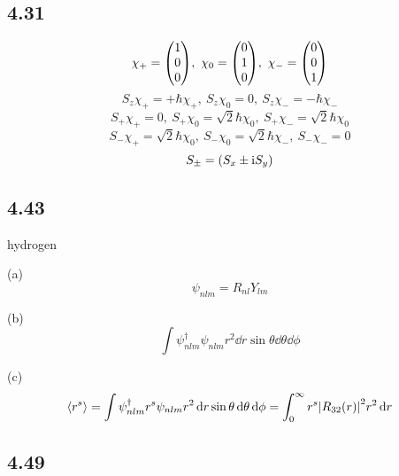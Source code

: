 \subsection{4.31}
\begin{framed}
    \[
    \chi_+ = \mqty(1 \\ 0 \\ 0),\ \chi_0 = \mqty(0 \\ 1 \\ 0),\ \chi_- = \mqty(0 \\ 0 \\ 1)
    \] \[
    S_z \chi_+ = + \hbar \chi_+,\ S_z \chi_0 = 0,\ S_z \chi_- = - \hbar \chi_-
    \] \[
    S_+ \chi_+ = 0,\ S_+ \chi_0 = \sqrt{2} \hbar \chi_0,\ S_+ \chi_- = \sqrt{2} \hbar \chi_0
    \] \[
    S_- \chi_+ = \sqrt{2} \hbar \chi_0,\ S_- \chi_0 = \sqrt{2} \hbar \chi_-,\ S_- \chi_- = 0
    \] \[
    S_{\pm} = \qty(S_x \pm \mathrm{i} S_y)
    \]
\end{framed}

\subsection{4.43}
\begin{framed}
    hydrogen

    (a)
    \[
    \psi_{nlm} = R_{nl} Y_{lm}
    \]

    (b)
    \[
    \int \psi_{nlm}^{\dagger} \psi_{nlm} r^2 \dd{r} \sin \theta \dd{\theta} \dd{\phi}
    \]

    (c)
    \[
    \expval{r^s} = \int \psi_{nlm}^{\dagger} r^s \psi_{nlm} r^2 \dd{r} \sin \theta \dd{\theta} \dd{\phi} = \int_0^{\infty} r^s \qty|R_{3 2}(r)|^2 r^2 \dd{r}
    \]
\end{framed}

\subsection{4.49}
\begin{framed}
    
\end{framed}

